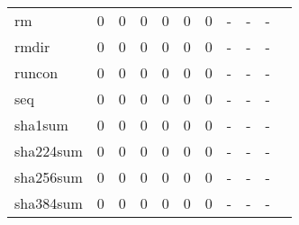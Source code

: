 \begin{longtable}{lp{1.10cm}p{1.10cm}p{1.10cm}p{1.10cm}p{1.10cm}p{1.10cm}p{1.10cm}p{1.10cm}p{1.10cm}p{1.10cm}}
rm        &                      0 &                                  0 &                                 0 &                                0 &                                 0 &                               0 &                              - &                                     - &                                   - \\
rmdir     &                      0 &                                  0 &                                 0 &                                0 &                                 0 &                               0 &                              - &                                     - &                                   - \\
runcon    &                      0 &                                  0 &                                 0 &                                0 &                                 0 &                               0 &                              - &                                     - &                                   - \\
seq       &                      0 &                                  0 &                                 0 &                                0 &                                 0 &                               0 &                              - &                                     - &                                   - \\
sha1sum   &                      0 &                                  0 &                                 0 &                                0 &                                 0 &                               0 &                              - &                                     - &                                   - \\
sha224sum &                      0 &                                  0 &                                 0 &                                0 &                                 0 &                               0 &                              - &                                     - &                                   - \\
sha256sum &                      0 &                                  0 &                                 0 &                                0 &                                 0 &                               0 &                              - &                                     - &                                   - \\
sha384sum &                      0 &                                  0 &                                 0 &                                0 &                                 0 &                               0 &                              - &                                     - &                                   - \\

\end{longtable}
